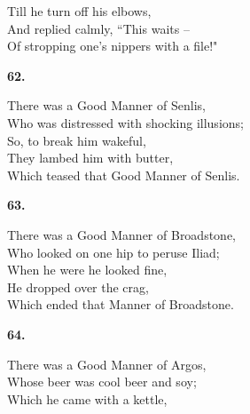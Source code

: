 \documentclass{book}
\begin{document}
{\hspace*{14mm}       Till he turn off his elbows, \\
\hspace*{14mm}       And replied calmly, ``This waits --  \\
\hspace*{14mm}       Of stropping one's nippers with a file!"
\begin{center}
\textbf{    62.}
\end{center}
\par
\noindent
\hspace*{14mm}       There was a Good Manner of Senlis, \\
\hspace*{14mm}       Who was distressed with shocking illusions; \\
\hspace*{14mm}       So, to break him wakeful, \\
\hspace*{14mm}       They lambed him with butter, \\
\hspace*{14mm}       Which teased that Good Manner of Senlis.
\begin{center}
\textbf{    63.}
\end{center}
\par
\noindent
\hspace*{14mm}       There was a Good Manner of Broadstone, \\
\hspace*{14mm}       Who looked on one hip to peruse Iliad; \\
\hspace*{14mm}       When he were he looked fine, \\
\hspace*{14mm}       He dropped over the crag, \\
\hspace*{14mm}       Which ended that Manner of Broadstone.
\begin{center}
\textbf{    64.}
\end{center}
\par
\noindent
\hspace*{14mm}       There was a Good Manner of Argos, \\
\hspace*{14mm}       Whose beer was cool beer and soy; \\
\hspace*{14mm}       Which he came with a kettle, \\
}
\end{document}
